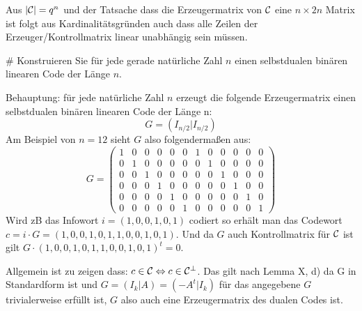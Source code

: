 \begin{myList}
Aus $|\mathcal{C}| = q^n$ und der Tatsache dass die Erzeugermatrix von $\mathcal{C}$ eine $n \times 2n$ Matrix ist folgt aus Kardinalitätsgründen auch dass alle Zeilen der Erzeuger/Kontrollmatrix linear unabhängig sein müssen.

#
Konstruieren Sie für jede gerade natürliche Zahl $n$ einen selbstdualen binären linearen Code der Länge $n$.\medskip

Behauptung: für jede natürliche Zahl $n$ erzeugt die folgende Erzeugermatrix einen selbstdualen binären linearen Code der Länge n:
\begin{equation*}
	G = (I_{n/2} | I_{n/2})
\end{equation*}
Am Beispiel von $n = 12$ sieht $G$ also folgendermaßen aus:
\begin{equation*}
	G = 
	\begin{pmatrix}
	1 & 0 & 0 & 0 & 0 & 0 		& 1 & 0 & 0 & 0 & 0 & 0\\
	0 & 1 & 0 & 0 & 0 & 0 		& 0 & 1 & 0 & 0 & 0 & 0\\
	0 & 0 & 1 & 0 & 0 & 0 		& 0 & 0 & 1 & 0 & 0 & 0\\
	0 & 0 & 0 & 1 & 0 & 0 		& 0 & 0 & 0 & 1 & 0 & 0\\
	0 & 0 & 0 & 0 & 1 & 0 		& 0 & 0 & 0 & 0 & 1 & 0\\
	0 & 0 & 0 & 0 & 0 & 1 		& 0 & 0 & 0 & 0 & 0 & 1
	\end{pmatrix}
\end{equation*}
Wird zB das Infowort $i =(1,0,0,1,0,1)$ codiert so erhält man das Codewort $c = i \cdot G = (1,0,0,1,0,1,1,0,0,1,0,1)$. Und da $G$ auch Kontrollmatrix für $\mathcal{C}$ ist gilt $G \cdot (1,0,0,1,0,1,1,0,0,1,0,1)^t = 0$.\medskip

Allgemein ist zu zeigen dass: $c \in \mathcal{C} \Leftrightarrow c \in \mathcal{C}^\bot$.
Das gilt nach Lemma X, d) da G in Standardform ist und $G = (I_k|A) = (-A^t|I_k)$ für das angegebene $G$ trivialerweise erfüllt ist, $G$ also auch eine Erzeugermatrix des dualen Codes ist.
\end{myList}
